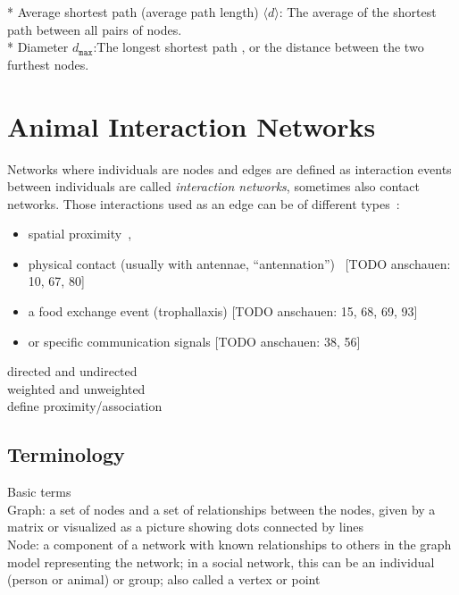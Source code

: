 * Average shortest path (average path length) $\langle d \rangle$: The average of the shortest path between all pairs of nodes.\\

* Diameter $d_{\texttt{max}}$:The longest shortest path , or the distance between the two furthest nodes.\\




\section{Animal Interaction Networks}

Networks where individuals are nodes and edges are defined as interaction events between individuals are called \emph{interaction networks}, sometimes also contact networks. 
Those interactions used as an edge can be of different types~\cite{charbonneau2013social}:

\begin{itemize}
\item spatial proximity~\cite{jeanson2012long, otterstatter2007contact},
\item physical contact (usually with antennae, “antennation”)~\cite{mersch2013tracking} [TODO anschauen: 10, 67, 80]
\item a food exchange event (trophallaxis) [TODO anschauen: 15, 68, 69, 93]
\item or specific communication signals [TODO anschauen: 38, 56]
\end{itemize}

directed and undirected\\
weighted and unweighted\\

define proximity/association\\

\subsection{Terminology}
Basic terms\\

Graph: a set of nodes and a set of relationships between the
nodes, given by a matrix or visualized as a picture showing
dots connected by lines\\

Node: a component of a network with known relationships
to others in the graph model representing the network; in
a social network, this can be an individual (person or animal)
or group; also called a vertex or point\\

